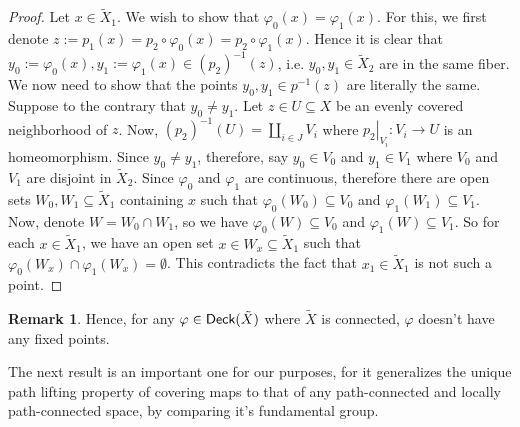 \documentclass[letterpaper,11pt,twoside]{article}
\theoremstyle{definition}
\theoremstyle{definition}
\theoremstyle{definition}
\newtheorem{remark}[proposition]{\textbf{Remark}}
\theoremstyle{definition}
\theoremstyle{definition}
\theoremstyle{definition}
\theoremstyle{remark}
\theoremstyle{definition}
\newcommand{\rest}[2]{\left. { #1 }\right \vert_{#2}}
\newcommand{\inv}[1]{\left(#1\right)^{-1}}
\newcommand{\Deck}[1]{{\fontfamily{lmss}\selectfont 
		\text{Deck}(#1)
}}
\begin{document}
\begin{proof}
	Let $ x\in \tilde{X}_1 $. We wish to show that $ \varphi_0(x) = \varphi_1(x) $. For this, we first denote $ z:= p_1(x) = p_2\circ \varphi_0(x) = p_2 \circ \varphi_1(x)$. Hence it is clear that $ y_0:=\varphi_0(x) ,y_1:=\varphi_1(x) \in \inv{p_2}(z) $, i.e. $ y_0,y_1 \in \tilde{X}_2 $ are in the same fiber. We now need to show that the points $ y_0,y_1 \in p^{-1}(z) $ are literally the same. Suppose to the contrary that $ y_0 \neq y_1 $. Let $ z\in U \subseteq X $ be an evenly covered neighborhood of $ z $. Now, $ \inv{p_2}(U) = \coprod_{i\in J} V_i $ where $ \rest{p_2}{V_i} : V_i \to U$ is an homeomorphism. Since $ y_0 \neq y_1$, therefore, say $ y_0 \in V_0 $ and $ y_1\in V_1 $ where $ V_0 $ and $ V_1 $ are disjoint in $\tilde{X}_2 $. Since $ \varphi_0 $ and $ \varphi_1 $ are continuous, therefore there are open sets $ W_0,W_1\subseteq \tilde{X}_1 $ containing $ x $ such that $ \varphi_0(W_0) \subseteq V_0 $ and $ \varphi_1(W_1)\subseteq V_1 $. Now, denote $ W= W_0\cap W_1 $, so we have $ \varphi_0(W) \subseteq V_0 $ and $ \varphi_1(W) \subseteq V_1 $. So for each $ x\in \tilde{X}_1 $, we have an open set $ x\in W_x \subseteq \tilde{X}_1 $ such that $ \varphi_0(W_x) \cap \varphi_1(W_x) = \emptyset $. This contradicts the fact that $ x_1\in \tilde{X}_1 $ is not such a point.
\end{proof}
\begin{remark}
	Hence, for any $ \varphi \in \Deck{\tilde{X}} $ where $ \tilde{X} $ is connected, $ \varphi $ doesn't have any fixed points.
\end{remark}
The next result is an important one for our purposes, for it generalizes the unique path lifting property of covering maps to that of any path-connected and locally path-connected space, by comparing it's fundamental group.
\end{document}
